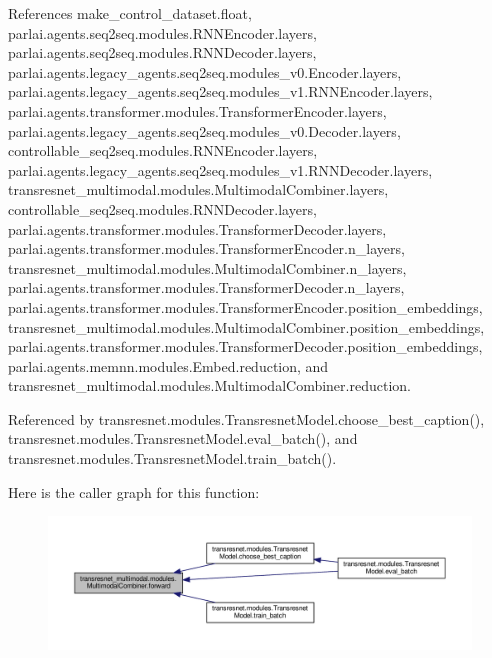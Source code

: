 References make\+\_\+control\+\_\+dataset.\+float, parlai.\+agents.\+seq2seq.\+modules.\+R\+N\+N\+Encoder.\+layers, parlai.\+agents.\+seq2seq.\+modules.\+R\+N\+N\+Decoder.\+layers, parlai.\+agents.\+legacy\+\_\+agents.\+seq2seq.\+modules\+\_\+v0.\+Encoder.\+layers, parlai.\+agents.\+legacy\+\_\+agents.\+seq2seq.\+modules\+\_\+v1.\+R\+N\+N\+Encoder.\+layers, parlai.\+agents.\+transformer.\+modules.\+Transformer\+Encoder.\+layers, parlai.\+agents.\+legacy\+\_\+agents.\+seq2seq.\+modules\+\_\+v0.\+Decoder.\+layers, controllable\+\_\+seq2seq.\+modules.\+R\+N\+N\+Encoder.\+layers, parlai.\+agents.\+legacy\+\_\+agents.\+seq2seq.\+modules\+\_\+v1.\+R\+N\+N\+Decoder.\+layers, transresnet\+\_\+multimodal.\+modules.\+Multimodal\+Combiner.\+layers, controllable\+\_\+seq2seq.\+modules.\+R\+N\+N\+Decoder.\+layers, parlai.\+agents.\+transformer.\+modules.\+Transformer\+Decoder.\+layers, parlai.\+agents.\+transformer.\+modules.\+Transformer\+Encoder.\+n\+\_\+layers, transresnet\+\_\+multimodal.\+modules.\+Multimodal\+Combiner.\+n\+\_\+layers, parlai.\+agents.\+transformer.\+modules.\+Transformer\+Decoder.\+n\+\_\+layers, parlai.\+agents.\+transformer.\+modules.\+Transformer\+Encoder.\+position\+\_\+embeddings, transresnet\+\_\+multimodal.\+modules.\+Multimodal\+Combiner.\+position\+\_\+embeddings, parlai.\+agents.\+transformer.\+modules.\+Transformer\+Decoder.\+position\+\_\+embeddings, parlai.\+agents.\+memnn.\+modules.\+Embed.\+reduction, and transresnet\+\_\+multimodal.\+modules.\+Multimodal\+Combiner.\+reduction.



Referenced by transresnet.\+modules.\+Transresnet\+Model.\+choose\+\_\+best\+\_\+caption(), transresnet.\+modules.\+Transresnet\+Model.\+eval\+\_\+batch(), and transresnet.\+modules.\+Transresnet\+Model.\+train\+\_\+batch().

Here is the caller graph for this function\+:
\nopagebreak
\begin{figure}[H]
\begin{center}
\leavevmode
\includegraphics[width=350pt]{classtransresnet__multimodal_1_1modules_1_1MultimodalCombiner_a6967efeaad96c86a9993b959a3c7c713_icgraph}
\end{center}
\end{figure}


